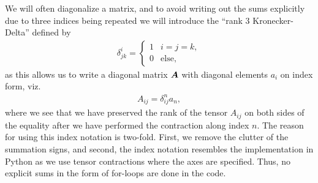         We will often diagonalize a matrix, and to avoid writing out the sums
        explicitly due to three indices being repeated we will introduce the
        ``rank 3 Kronecker-Delta'' defined by
        \begin{align}
            \delta^{i}_{jk} = \begin{cases}
                1 & i = j = k, \\
                0 & \text{else},
            \end{cases}
            \label{eq:rank-3-kd}
        \end{align}
        as this allows us to write a diagonal matrix $\boldsymbol{A}$ with diagonal
        elements $a_i$ on index form, viz.
        \begin{align}
            A_{ij} = \delta^{n}_{ij} a_{n},
        \end{align}
        where we see that we have preserved the rank of the tensor $A_{ij}$ on
        both sides of the equality after we have performed the contraction along
        index $n$.
        The reason for using this index notation is two-fold. First, we remove
        the clutter of the summation signs, and second, the index notation
        resembles the implementation in Python as we use tensor contractions
        where the axes are specified.
        Thus, no explicit sums in the form of for-loops are done in the code.

